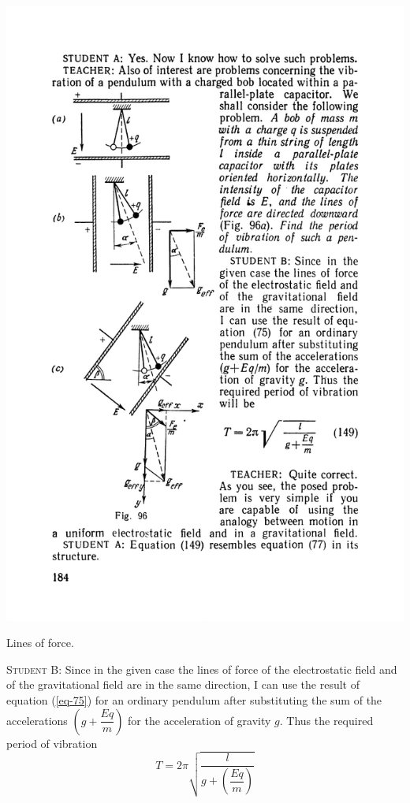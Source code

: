 \documentclass[a4paper,sfsidenotes]{tufte-book}
\begin{document}
\begin{marginfigure}%
\centering
\includegraphics[width=1.19\linewidth]{fig-096a}
\caption{Lines of force.}
\label{fig-96}
\end{marginfigure}
\textsc{Student B:} Since in the given case the lines of force of the electrostatic field and of the gravitational field are in the same direction, I can use the result of equation (\ref{eq-75}) for an ordinary pendulum after substituting the sum of the accelerations $(g+\dfrac{Eq}{m})$ for the acceleration of gravity $g$. Thus the required period of vibration
\begin{equation}%
T = 2 \pi \sqrt{\dfrac{l}{ g+\left(\dfrac{Eq}{m} \right)}}
\label{eq-149}
\end{equation}
\end{document}
